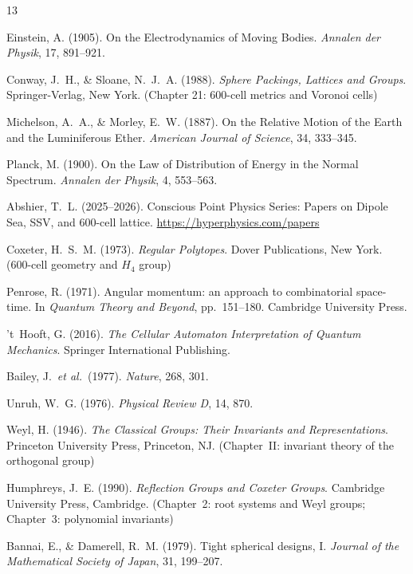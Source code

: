 \documentclass[11pt,letterpaper]{article}
\begin{document}
\begin{thebibliography}{13}

Einstein, A. (1905). 
On the Electrodynamics of Moving Bodies. 
\textit{Annalen der Physik}, 17, 891--921.

Conway, J.~H., \& Sloane, N.~J.~A. (1988). 
\textit{Sphere Packings, Lattices and Groups}. 
Springer-Verlag, New York. 
(Chapter 21: 600-cell metrics and Voronoi cells)

Michelson, A.~A., \& Morley, E.~W. (1887). 
On the Relative Motion of the Earth and the Luminiferous Ether. 
\textit{American Journal of Science}, 34, 333--345.

Planck, M. (1900). 
On the Law of Distribution of Energy in the Normal Spectrum. 
\textit{Annalen der Physik}, 4, 553--563.

Abshier, T.~L. (2025--2026). 
Conscious Point Physics Series: Papers on Dipole Sea, SSV, and 600-cell lattice. 
\url{https://hyperphysics.com/papers}

Coxeter, H.~S.~M. (1973). 
\textit{Regular Polytopes}. 
Dover Publications, New York. 
(600-cell geometry and $H_4$ group)

Penrose, R. (1971). 
Angular momentum: an approach to combinatorial space-time. 
In \textit{Quantum Theory and Beyond}, pp.~151--180. 
Cambridge University Press.

't~Hooft, G. (2016). 
\textit{The Cellular Automaton Interpretation of Quantum Mechanics}. 
Springer International Publishing.

Bailey, J.\ \textit{et al.}\ (1977). 
\textit{Nature}, 268, 301.

Unruh, W.~G. (1976). 
\textit{Physical Review D}, 14, 870.

Weyl, H. (1946).
\textit{The Classical Groups: Their Invariants and Representations}.
Princeton University Press, Princeton, NJ.
(Chapter~II: invariant theory of the orthogonal group)

Humphreys, J.~E. (1990).
\textit{Reflection Groups and Coxeter Groups}.
Cambridge University Press, Cambridge.
(Chapter~2: root systems and Weyl groups; Chapter~3: polynomial 
invariants)

Bannai, E., \& Damerell, R.~M. (1979).
Tight spherical designs, I.
\textit{Journal of the Mathematical Society of Japan}, 31, 199--207.


\end{thebibliography}
\end{document}
